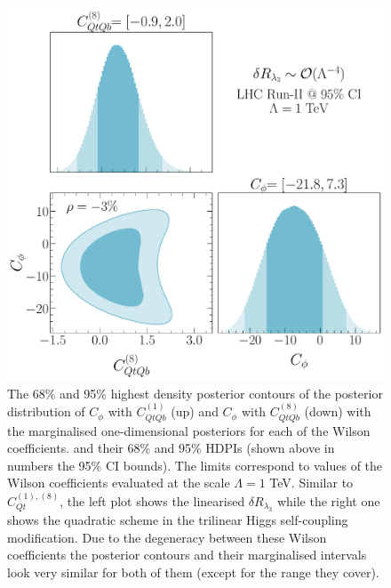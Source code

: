 \begin{figure}[h!]
\begin{center}
		\includegraphics[width=0.45\linewidth]{fig/Cqtqb8_LHC_RunII_quadl3_rge} 
	\end{center}
	\caption{The 68\% and 95\% highest density posterior contours of the posterior distribution of $C_\phi$ with $C_{QtQb}^{(1)}$ (up) and $C_\phi$ with $C_{QtQb}^{(8)}$ (down) with the marginalised one-dimensional posteriors for each of the Wilson coefficients. and their 68\% and 95\% HDPIs (shown above in numbers the 95\% CI bounds). 
		The limits correspond to values of the Wilson coefficients evaluated at the scale $\Lambda=1$ TeV. 
		Similar to $C_{Qt}^{(1),(8)}$, the left plot shows the linearised  $\delta R_{\lambda_3}$ while the right one shows the quadratic scheme in the trilinear Higgs self-coupling modification. Due to the degeneracy between these Wilson coefficients the posterior contours and their marginalised intervals look very similar for both of them (except for the range they cover).  \label{2param-cqtqb} }
\end{figure}